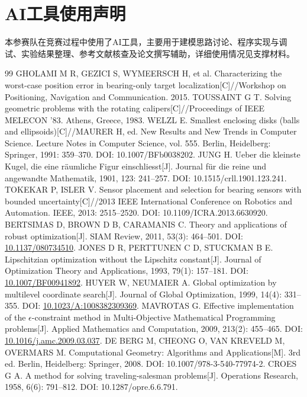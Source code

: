 \section*{AI工具使用声明}
本参赛队在竞赛过程中使用了AI工具，主要用于建模思路讨论、程序实现与调试、实验结果整理、参考文献核查及论文撰写辅助，详细使用情况见支撑材料。

\begin{thebibliography}{99}
 GHOLAMI M R, GEZICI S, WYMEERSCH H, et al. Characterizing the worst-case position error in bearing-only target localization[C]//Workshop on Positioning, Navigation and Communication. 2015.
 TOUSSAINT G T. Solving geometric problems with the rotating calipers[C]//Proceedings of IEEE MELECON '83. Athens, Greece, 1983.
 WELZL E. Smallest enclosing disks (balls and ellipsoids)[C]//MAURER H, ed. New Results and New Trends in Computer Science. Lecture Notes in Computer Science, vol. 555. Berlin, Heidelberg: Springer, 1991: 359--370. DOI: 10.1007/BFb0038202.
 JUNG H. Ueber die kleinste Kugel, die eine räumliche Figur einschliesst[J]. Journal für die reine und angewandte Mathematik, 1901, 123: 241--257. DOI: 10.1515/crll.1901.123.241.
 TOKEKAR P, ISLER V. Sensor placement and selection for bearing sensors with bounded uncertainty[C]//2013 IEEE International Conference on Robotics and Automation. IEEE, 2013: 2515--2520. DOI: 10.1109/ICRA.2013.6630920.
 BERTSIMAS D, BROWN D B, CARAMANIS C. Theory and applications of robust optimization[J]. SIAM Review, 2011, 53(3): 464--501. DOI: \url{10.1137/080734510}.
 JONES D R, PERTTUNEN C D, STUCKMAN B E. Lipschitzian optimization without the Lipschitz constant[J]. Journal of Optimization Theory and Applications, 1993, 79(1): 157--181. DOI: \url{10.1007/BF00941892}.
 HUYER W, NEUMAIER A. Global optimization by multilevel coordinate search[J]. Journal of Global Optimization, 1999, 14(4): 331--355. DOI: \url{10.1023/A:1008382309369}.
 MAVROTAS G. Effective implementation of the $\epsilon$-constraint method in Multi-Objective Mathematical Programming problems[J]. Applied Mathematics and Computation, 2009, 213(2): 455--465. DOI: \url{10.1016/j.amc.2009.03.037}.
 DE BERG M, CHEONG O, VAN KREVELD M, OVERMARS M. Computational Geometry: Algorithms and Applications[M]. 3rd ed. Berlin, Heidelberg: Springer, 2008. DOI: 10.1007/978-3-540-77974-2.
 CROES G A. A method for solving traveling-salesman problems[J]. Operations Research, 1958, 6(6): 791--812. DOI: 10.1287/opre.6.6.791.
\end{thebibliography}
\label{end:body}

